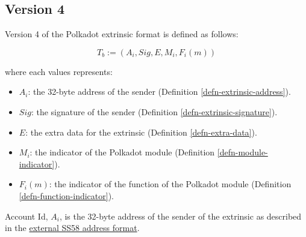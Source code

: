 \subsection{Version 4}
\label{sect-version-four}

Version 4 of the Polkadot extrinsic format is defined as follows:

\[
    T_b := (A_i, Sig, E, M_i, F_i(m))
\]

where each values represents:
\begin{itemize}
    \item $A_i$: the 32-byte address of the sender (Definition \ref{defn-extrinsic-address}).
    \item $Sig$: the signature of the sender (Definition \ref{defn-extrinsic-signature}).
    \item $E$: the extra data for the extrinsic (Definition \ref{defn-extra-data}).
    \item $M_i$: the indicator of the Polkadot module (Definition \ref{defn-module-indicator}).
    \item $F_i(m)$: the indicator of the function of the Polkadot module (Definition \ref{defn-function-indicator}).
\end{itemize}

\begin{definition}
    \label{defn-extrinsic-address}
    Account Id, $A_i$, is the 32-byte address of the sender of the extrinsic as
    described in the
    \href{https://github.com/paritytech/substrate/wiki/External-Address-Format-(SS58)}{external
    SS58 address format}.
\end{definition}

